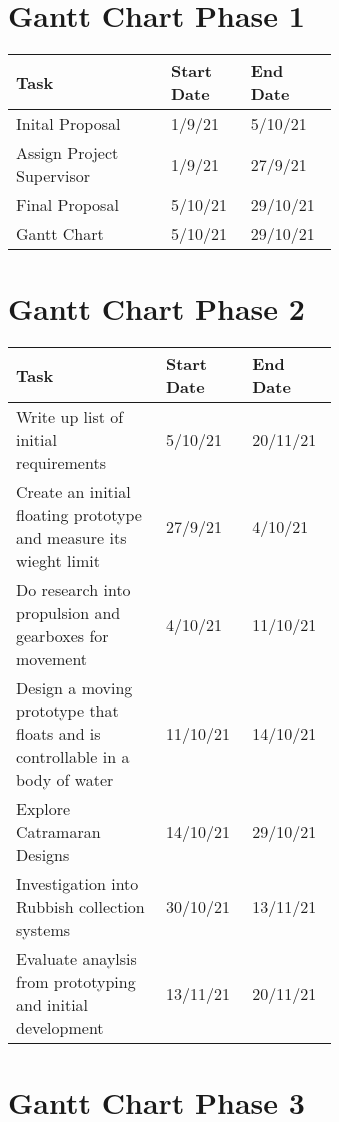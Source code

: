 \documentclass [11pt]{article}
\begin{document}
\section{Gantt Chart Phase 1}\label{app:phase_1}

\begin{table}[H]
\centering
\begin{tabular}{||p{0.4\linewidth}|p{0.12\linewidth}|p{0.12\linewidth}||}
\hline
Task & Start Date & End Date \\
\hline
Inital Proposal & 1/9/21 & 5/10/21 \\
\hline
Assign Project Supervisor & 1/9/21 & 27/9/21 \\
\hline
Final Proposal & 5/10/21 & 29/10/21 \\
\hline
Gantt Chart & 5/10/21 & 29/10/21 \\
\hline
\end{tabular}
\end{table}

\section{Gantt Chart Phase 2}\label{app:phase_2}

\begin{table}[H]
\centering
\begin{tabular}{||p{0.4\linewidth}|p{0.12\linewidth}|p{0.12\linewidth}||}
\hline
Task & Start Date & End Date \\
\hline
Write up list of initial requirements & 5/10/21 & 20/11/21 \\
\hline
Create an initial floating prototype and measure its wieght limit &	27/9/21 & 4/10/21 \\
\hline
Do research into propulsion and gearboxes for movement & 4/10/21 & 11/10/21 \\
\hline
Design a moving prototype that floats and is controllable in a body of water & 11/10/21	& 14/10/21 \\
\hline
Explore Catramaran Designs & 14/10/21 & 29/10/21 \\
\hline
Investigation into  Rubbish collection systems & 30/10/21 & 13/11/21 \\
\hline
Evaluate anaylsis from prototyping and initial development & 13/11/21 & 20/11/21 \\
\hline
\end{tabular}
\end{table}

\section{Gantt Chart Phase 3}\label{app:phase_3}
\end{document}
